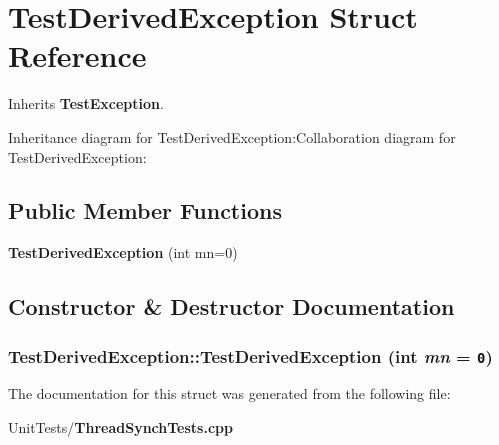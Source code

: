 \section{Test\-Derived\-Exception Struct Reference}
\label{struct_test_derived_exception}
Inherits {\bf Test\-Exception}.

Inheritance diagram for Test\-Derived\-Exception:Collaboration diagram for Test\-Derived\-Exception:\subsection*{Public Member Functions}
\begin{CompactItemize}
\item 
{\bf Test\-Derived\-Exception} (int mn=0)
\end{CompactItemize}


\subsection{Constructor \& Destructor Documentation}
\subsubsection{\setlength{\rightskip}{0pt plus 5cm}Test\-Derived\-Exception::Test\-Derived\-Exception (int {\em mn} = {\tt 0})\hspace{0.3cm}{\tt  [inline]}}\label{struct_test_derived_exception_71d1751eced1ad66cfb6fc4eaf7dbb1f}




The documentation for this struct was generated from the following file:\begin{CompactItemize}
\item 
Unit\-Tests/{\bf Thread\-Synch\-Tests.cpp}\end{CompactItemize}
